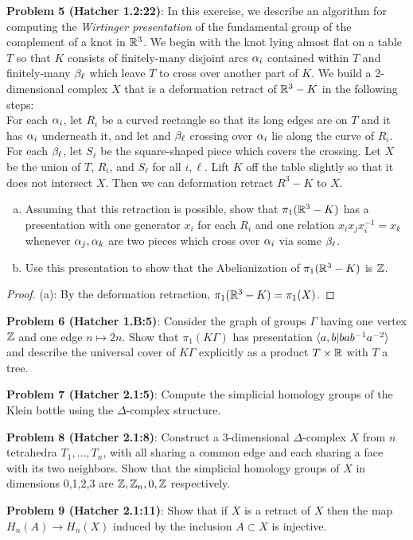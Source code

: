 \documentclass{amsart}
\begin{document}
\newpage
\textbf{Problem 5 (Hatcher 1.2:22)}: In this exercise, we describe an algorithm for computing the \textit{Wirtinger presentation} of the fundamental group of the complement of a knot in $\mathbb{R}^3$. We begin with the knot lying almost flat on a table $T$ so that $K$ consists of finitely-many disjoint arcs $\alpha_i$ contained within $T$ and finitely-many $\beta_{\ell}$ which leave $T$ to cross over another part of $K$. We build a 2-dimensional complex $X$ that is a deformation retract of $\mathbb{R}^3-K$ in the following steps:\\

For each $\alpha_i$, let $R_i$ be a curved rectangle so that its long edges are on $T$ and it has $\alpha_i$ underneath it, and let and $\beta_{\ell}$ crossing over $\alpha_i$ lie along the curve of $R_i$. For each $\beta_{\ell}$, let $S_{\ell}$ be the square-shaped piece which covers the crossing. Let $X$ be the union of $T$, $R_i$, and $S_{\ell}$ for all $i,\ell$. Lift $K$ off the table slightly so that it does not intersect $X$. Then we can deformation retract $R^3-K$ to $X$.\\

\begin{enumerate}[(a)]
	\item Assuming that this retraction is possible, show that $\pi_1(\mathbb{R}^3-K)$ has a presentation with one generator $x_i$ for each $R_i$ and one relation $x_ix_jx_i^{-1}=x_k$ whenever $\alpha_j,\alpha_k$ are two pieces which cross over $\alpha_i$ via some $\beta_{\ell}$.
	\item Use this presentation to show that the Abelianization of $\pi_1(\mathbb{R}^3-K)$ is $\mathbb{Z}$.
\end{enumerate}
\begin{proof}
	(a): By the deformation retraction, $\pi_1(\mathbb{R}^3-K)=\pi_1(X)$.
\end{proof}

\newpage
\textbf{Problem 6 (Hatcher 1.B:5)}: Consider the graph of groups $\Gamma$ having one vertex $\mathbb{Z}$ and one edge $n\mapsto 2n$. Show that $\pi_1(K\Gamma)$ has presentation $\langle a,b|bab^{-1}a^{-2}\rangle$ and describe the universal cover of $K\Gamma$ explicitly as a product $T\times \mathbb{R}$ with $T$ a tree.

\newpage
\textbf{Problem 7 (Hatcher 2.1:5)}: Compute the simplicial homology groups of the Klein bottle using the $\Delta$-complex structure.

\newpage
\textbf{Problem 8 (Hatcher 2.1:8)}: Construct a 3-dimensional $\Delta$-complex $X$ from $n$ tetrahedra $T_1,\dots,T_n$, with all sharing a common edge and each sharing a face with its two neighbors. Show that the simplicial homology groups of $X$ in dimensions 0,1,2,3 are $\mathbb{Z},\mathbb{Z}_n,0,\mathbb{Z}$ respectively.

\newpage 
\textbf{Problem 9 (Hatcher 2.1:11)}: Show that if $X$ is a retract of $X$ then the map $H_n(A)\to H_n(X)$ induced by the inclusion $A\subset X$ is injective.
\end{document}
